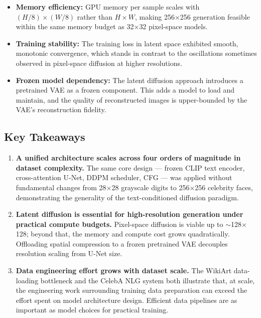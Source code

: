 \begin{itemize}
    \item \textbf{Memory efficiency:} GPU memory per sample scales with $(H/8)\times(W/8)$ rather than $H\times W$, making 256$\times$256 generation feasible within the same memory budget as 32$\times$32 pixel-space models.
    \item \textbf{Training stability:} The training loss in latent space exhibited smooth, monotonic convergence, which stands in contrast to the oscillations sometimes observed in pixel-space diffusion at higher resolutions.
    \item \textbf{Frozen model dependency:} The latent diffusion approach introduces a pretrained VAE as a frozen component. This adds a model to load and maintain, and the quality of reconstructed images is upper-bounded by the VAE's reconstruction fidelity.
\end{itemize}

\subsection{Key Takeaways}

\begin{enumerate}
    \item \textbf{A unified architecture scales across four orders of magnitude in dataset complexity.} The same core design --- frozen CLIP text encoder, cross-attention U-Net, DDPM scheduler, CFG --- was applied without fundamental changes from 28$\times$28 grayscale digits to 256$\times$256 celebrity faces, demonstrating the generality of the text-conditioned diffusion paradigm.

    \item \textbf{Latent diffusion is essential for high-resolution generation under practical compute budgets.} Pixel-space diffusion is viable up to $\sim$128$\times$128; beyond that, the memory and compute cost grows quadratically. Offloading spatial compression to a frozen pretrained VAE decouples resolution scaling from U-Net size.

    \item \textbf{Data engineering effort grows with dataset scale.} The WikiArt data-loading bottleneck and the CelebA NLG system both illustrate that, at scale, the engineering work surrounding training data preparation can exceed the effort spent on model architecture design. Efficient data pipelines are as important as model choices for practical training.
\end{enumerate}

